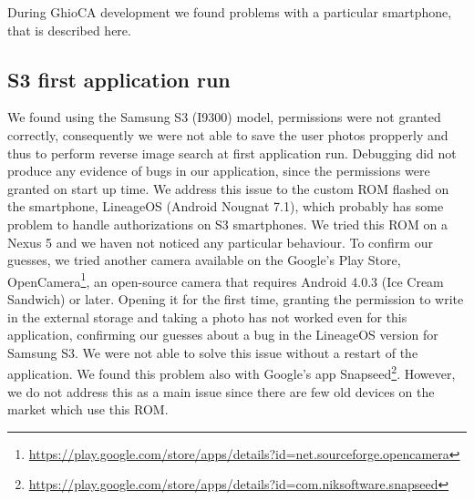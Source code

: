 During GhioCA development we found problems with a particular smartphone, that is described here.

\subsection{S3 first application run}

We found using the Samsung S3 (I9300) model, permissions were not granted correctly, consequently we were not able to save the user photos propperly and thus to perform reverse image search at first application run. Debugging did not produce any evidence of bugs in our application, since the permissions were granted on start up time.
We address this issue to the custom ROM flashed on the smartphone, LineageOS (Android Nougnat 7.1), which probably has some problem to handle authorizations on S3 smartphones. We tried this ROM on a Nexus 5 and we haven not noticed any particular behaviour.
To confirm our guesses, we tried another camera available on the Google's Play Store, OpenCamera\footnote{\url{https://play.google.com/store/apps/details?id=net.sourceforge.opencamera}}, an open-source camera that requires Android 4.0.3 (Ice Cream Sandwich) or later.
Opening it for the first time, granting the permission to write in the external storage and taking a photo has not worked even for this application, confirming our guesses about a bug in the LineageOS version for Samsung S3.
We were not able to solve this issue without a restart of the application. We found this problem also with Google's app Snapseed\footnote{\url{https://play.google.com/store/apps/details?id=com.niksoftware.snapseed}}.
However, we do not address this as a main issue since there are few old devices on the market which use this ROM.
